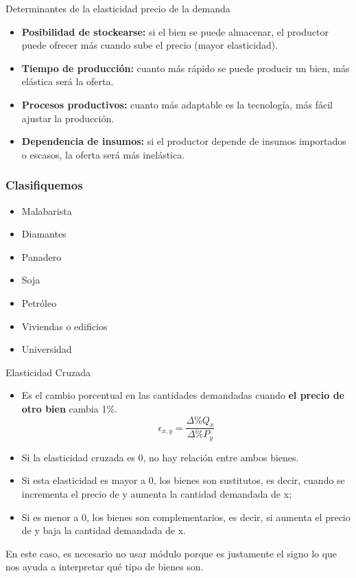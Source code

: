 \documentclass{beamer}
\begin{document}
\begin{frame}{Determinantes de la elasticidad precio de la demanda}
  \begin{itemize}
      \item \textbf{Posibilidad de stockearse:} si el bien se puede almacenar, el productor puede ofrecer más cuando sube el precio (mayor elasticidad).    
      \item \textbf{Tiempo de producción:} cuanto más rápido se puede producir un bien, más elástica será la oferta.
      \item \textbf{Procesos productivos:} cuanto más adaptable es la tecnología, más fácil ajustar la producción.
      \item \textbf{Dependencia de insumos:} si el productor depende de insumos importados o escasos, la oferta será más inelástica.
    \end{itemize}
\end{frame}

\begin{frame}
\frametitle{Clasifiquemos}
\begin{itemize}
    \item Malabarista
    \item Diamantes
    \item Panadero
    \item Soja
    \item Petróleo
    \item Viviendas o edificios
    \item Universidad
\end{itemize}
\end{frame}


      
\begin{frame}{Elasticidad Cruzada}
  \begin{itemize}
    \item Es el cambio porcentual en las cantidades demandadas cuando \textbf{el precio de otro bien} cambia 1\%.
    \begin{equation*}
      \epsilon_{x,y} = \frac{\Delta \% Q_x}{\Delta \% P_y}
    \end{equation*}
        \item Si la elasticidad cruzada es 0, no hay relación entre ambos bienes.
        \item Si esta elasticidad es mayor a 0, los bienes son sustitutos, es decir, cuando se incrementa el precio de y aumenta la cantidad demandada de x; 
        \item Si es menor a 0, los bienes son complementarios, es decir, si aumenta el precio de y baja la cantidad demandada de x.
  \end{itemize}
  \item En este caso, es necesario no usar módulo porque es justamente el signo lo que nos ayuda a interpretar qué tipo de bienes son. 
\end{frame}
\end{document}

